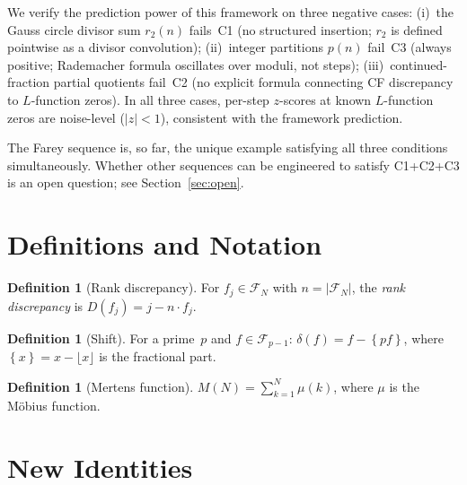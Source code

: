 \documentclass[11pt]{article}
\theoremstyle{definition}
\newtheorem{definition}[theorem]{Definition}
\newcommand{\F}{\mathcal{F}}
\newcommand{\fpart}[1]{\left\{#1\right\}}
\begin{document}
We verify the prediction power of this framework on three negative cases:
(i)~the Gauss circle divisor sum $r_2(n)$ fails~C1 (no structured
insertion; $r_2$ is defined pointwise as a divisor convolution);
(ii)~integer partitions $p(n)$ fail~C3 (always positive; Rademacher
formula oscillates over moduli, not steps);
(iii)~continued-fraction partial quotients fail~C2 (no explicit
formula connecting CF discrepancy to $L$-function zeros).
In all three cases, per-step $z$-scores at known $L$-function zeros
are noise-level ($|z| < 1$), consistent with the framework prediction.

The Farey sequence is, so far, the unique example satisfying all three
conditions simultaneously.  Whether other sequences can be engineered
to satisfy C1+C2+C3 is an open question; see
Section~\ref{sec:open}.


\section{Definitions and Notation}\label{sec:defs}

\begin{definition}[Rank discrepancy]
For $f_j \in \F_N$ with $n = |\F_N|$, the \emph{rank discrepancy} is
$D(f_j) = j - n \cdot f_j$.
\end{definition}

\begin{definition}[Shift]
For a prime~$p$ and $f \in \F_{p-1}$:
$\delta(f) = f - \fpart{pf}$,
where $\fpart{x} = x - \lfloor x \rfloor$ is the fractional part.
\end{definition}

\begin{definition}[Mertens function]
$M(N) = \sum_{k=1}^{N} \mu(k)$,
where $\mu$ is the M\"obius function.
\end{definition}


\section{New Identities}\label{sec:identities}
\end{document}
